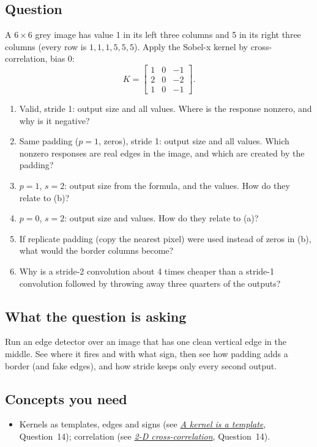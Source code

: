 \documentclass[12pt,a4paper]{article}
\newcommand{\seeconcept}[3]{(see \hyperref[#1]{\textit{#2}}, Question~#3)}
\begin{document}
\subsection*{Question}
A $6\times6$ grey image has value 1 in its left three columns and 5 in its right three columns (every row is $1,1,1,5,5,5$). Apply the Sobel-x kernel by cross-correlation, bias 0:
\[
K=\begin{bmatrix}1&0&-1\\2&0&-2\\1&0&-1\end{bmatrix}.
\]
\begin{enumerate}[label=(\alph*)]
\item Valid, stride 1: output size and all values. Where is the response nonzero, and why is it negative?
\item Same padding ($p=1$, zeros), stride 1: output size and all values. Which nonzero responses are real edges in the image, and which are created by the padding?
\item $p=1$, $s=2$: output size from the formula, and the values. How do they relate to (b)?
\item $p=0$, $s=2$: output size and values. How do they relate to (a)?
\item If replicate padding (copy the nearest pixel) were used instead of zeros in (b), what would the border columns become?
\item Why is a stride-2 convolution about 4 times cheaper than a stride-1 convolution followed by throwing away three quarters of the outputs?
\end{enumerate}

\subsection*{What the question is asking}
Run an edge detector over an image that has one clean vertical edge in the middle. See where it fires and with what sign, then see how padding adds a border (and fake edges), and how stride keeps only every second output.

\subsection*{Concepts you need}
\begin{itemize}[nosep]
\item Kernels as templates, edges and signs \seeconcept{c:template}{A kernel is a template}{14}; correlation \seeconcept{c:corr2d}{2-D cross-correlation}{14}.
\end{itemize}
\end{document}
